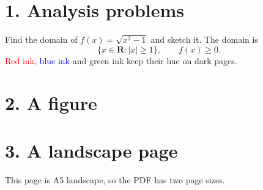 \documentclass[11pt]{article}
\begin{document}
\section*{1. Analysis problems}
Find the domain of $f(x)=\sqrt{x^2-1}$ and sketch it. The domain is
\[ \{x\in\mathbf{R} : |x|\ge 1\}, \qquad f(x)\ge 0. \]
\textcolor{red}{Red ink}, \textcolor{blue}{blue ink} and \textcolor{green!50!black}{green ink}
keep their hue on dark pages.
\newpage
\section*{2. A figure}
\begin{center}
\end{center}
\newpage
\pdfpagewidth=210mm \pdfpageheight=148mm
\section*{3. A landscape page}
This page is A5 landscape, so the PDF has two page sizes.
\end{document}
